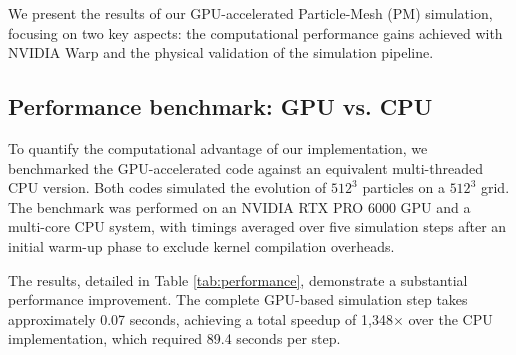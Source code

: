 \documentclass[]{article}
\begin{document}
We present the results of our GPU-accelerated Particle-Mesh (PM) simulation, focusing on two key aspects: the computational performance gains achieved with NVIDIA Warp and the physical validation of the simulation pipeline.

\subsection{Performance benchmark: GPU vs. CPU}
To quantify the computational advantage of our implementation, we benchmarked the GPU-accelerated code against an equivalent multi-threaded CPU version. Both codes simulated the evolution of $512^3$ particles on a $512^3$ grid. The benchmark was performed on an NVIDIA RTX PRO 6000 GPU and a multi-core CPU system, with timings averaged over five simulation steps after an initial warm-up phase to exclude kernel compilation overheads.

The results, detailed in Table \ref{tab:performance}, demonstrate a substantial performance improvement. The complete GPU-based simulation step takes approximately 0.07 seconds, achieving a total speedup of 1,348$\times$ over the CPU implementation, which required 89.4 seconds per step.

\begin{table}[t]
\centering
\caption{Per-step performance comparison between the GPU (NVIDIA Warp + cuFFT) and a multi-threaded CPU (NumPy/SciPy) implementation for a simulation with $512^3$ particles. The speedup factor highlights the significant acceleration achieved, particularly in the particle-grid operations.}
\label{tab:performance}
\end{table}
\end{document}
